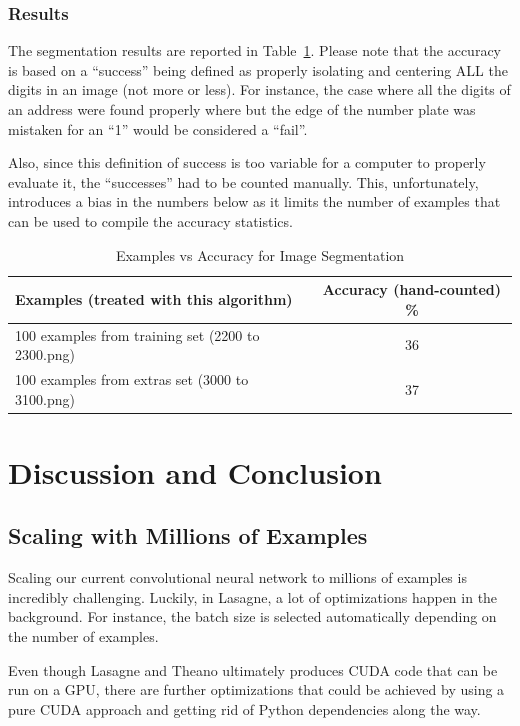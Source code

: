 \documentclass{article} %
\begin{document}
\subsubsection{Results}
The segmentation results are reported in Table~\ref{table:segmentation}. Please note that the accuracy is based on a “success” being defined as properly isolating and centering ALL the digits in an image (not more or less). For instance, the case where all the digits of an address were found properly where but the edge of the number plate was mistaken for an “1” would be considered a “fail”. 

Also, since this definition of success is too variable for a computer to properly evaluate it, the “successes” had to be counted manually. This, unfortunately, introduces a bias in the numbers below as it limits the number of examples that can be used to compile the accuracy statistics.

\begin{center}
\begin{table}[h]
  \begin{tabular}{ | l || c ||}
    \hline
    Examples (treated with this algorithm) & Accuracy (hand-counted) \% \\ \hline \hline
    100 examples from training set (2200 to 2300.png) &  36 \\ \hline
    100 examples from extras set (3000 to 3100.png) & 37 \\
    \hline
  \end{tabular}
  \caption{Examples vs Accuracy for Image Segmentation}
  \label{table:segmentation}
  \end{table}
\end{center}

\section{Discussion and Conclusion}
\subsection{Scaling with Millions of Examples}
Scaling our current convolutional neural network to millions of examples is incredibly challenging. Luckily, in Lasagne, a lot of optimizations happen in the background. For instance, the batch size is selected automatically depending on the number of examples.

Even though Lasagne and Theano ultimately produces CUDA code that can be run on a GPU, there are further optimizations that could be achieved by using a pure CUDA approach and getting rid of Python dependencies along the way. 
\end{document}

